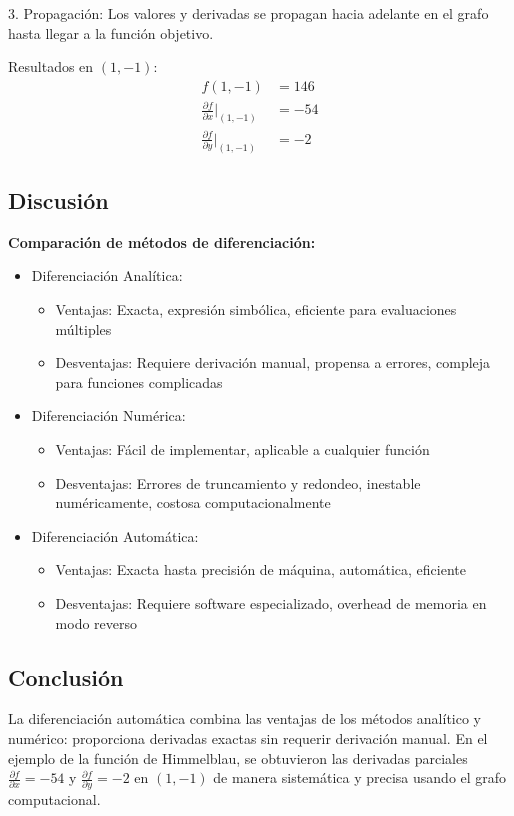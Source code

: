 \documentclass{article}
\begin{document}
3. Propagación: Los valores y derivadas se propagan hacia adelante en el grafo hasta llegar a la función objetivo.

Resultados en $(1,-1)$:
\begin{align}
f(1,-1) &= 146 \\
\frac{\partial f}{\partial x}\bigg|_{(1,-1)} &= -54 \\
\frac{\partial f}{\partial y}\bigg|_{(1,-1)} &= -2
\end{align}

\subsection{Discusión}

\textbf{Comparación de métodos de diferenciación:}

\begin{itemize}
    \item Diferenciación Analítica: 
        \begin{itemize}
            \item Ventajas: Exacta, expresión simbólica, eficiente para evaluaciones múltiples
            \item Desventajas: Requiere derivación manual, propensa a errores, compleja para funciones complicadas
        \end{itemize}
    
    \item Diferenciación Numérica:
        \begin{itemize}
            \item Ventajas: Fácil de implementar, aplicable a cualquier función
            \item Desventajas: Errores de truncamiento y redondeo, inestable numéricamente, costosa computacionalmente
        \end{itemize}
    
    \item Diferenciación Automática:
        \begin{itemize}
            \item Ventajas: Exacta hasta precisión de máquina, automática, eficiente
            \item Desventajas: Requiere software especializado, overhead de memoria en modo reverso
        \end{itemize}
\end{itemize}

\subsection{Conclusión}

La diferenciación automática combina las ventajas de los métodos analítico y numérico: proporciona derivadas exactas sin requerir derivación manual. En el ejemplo de la función de Himmelblau, se obtuvieron las derivadas parciales $\frac{\partial f}{\partial x} = -54$ y $\frac{\partial f}{\partial y} = -2$ en $(1,-1)$ de manera sistemática y precisa usando el grafo computacional.
\end{document}

